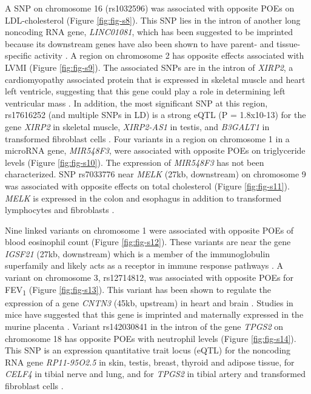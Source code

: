  A SNP on chromosome 16 (rs1032596) was associated with opposite POEs on LDL-cholesterol (Figure \ref{fig:fig-s8}). This SNP lies in the intron of another long noncoding RNA gene, \emph{LINC01081}, which has been suggested to be imprinted because its downstream genes have also been shown to have parent- and tissue-specific activity \cite{Szafranski:2016fz}. A region on chromosome 2 has opposite effects associated with LVMI (Figure \ref{fig:fig-s9}). The associated SNPs are in the intron of \emph{XIRP2}, a cardiomyopathy associated protein that is expressed in skeletal muscle and heart left ventricle, suggesting that this gene could play a role in determining left ventricular mass \cite{Wang:2014jg,Nilsson:2013jy,Consortium2015}. In addition, the most significant SNP at this region, rs17616252 (and multiple SNPs in LD) is a strong eQTL (P = 1.8x10-13) for the gene \emph{XIRP2} in skeletal muscle, \emph{XIRP2-AS1} in testis, and \emph{B3GALT1} in transformed fibroblast cells \cite{Consortium2015}. Four variants in a region on chromosome 1 in a microRNA gene, \emph{MIR548F3}, were associated with opposite POEs on triglyceride levels (Figure \ref{fig:fig-s10}). The expression of \emph{MIR548F3} has not been characterized. SNP rs7033776 near \emph{MELK} (27kb, downstream) on chromosome 9 was associated with opposite effects on total cholesterol (Figure \ref{fig:fig-s11}). \emph{MELK} is expressed in the colon and esophagus in addition to transformed lymphocytes and fibroblasts \cite{Consortium2015}. 


Nine linked variants on chromosome 1 were associated with opposite POEs of blood eosinophil count (Figure \ref{fig:fig-s12}). These variants are near the gene \emph{IGSF21} (27kb, downstream) which is a member of the immunoglobulin superfamily and likely acts as a receptor in immune response pathways \cite{OLeary:2016cm}. A variant on chromosome 3, rs12714812, was associated with opposite POEs for FEV\textsubscript{1} (Figure \ref{fig:fig-s13}). This variant has been shown to regulate the expression of a gene \emph{CNTN3} (45kb, upstream) in heart and brain \cite{Consortium2015}. Studies in mice have suggested that this gene is imprinted and maternally expressed in the murine placenta \cite{Brideau:2010gz}. Variant rs142030841 in the intron of the gene \emph{TPGS2} on chromosome 18 has opposite POEs with neutrophil levels (Figure \ref{fig:fig-s14}). This SNP is an expression quantitative trait locus (eQTL) for the noncoding RNA gene \emph{RP11-95O2.5} in skin, testis, breast, thyroid and adipose tissue, for \emph{CELF4} in tibial nerve and lung, and for \emph{TPGS2} in tibial artery and transformed fibroblast cells \cite{Consortium2015}.


